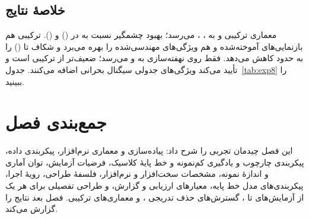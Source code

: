 \subsection{خلاصۀ نتایج}

معماری ترکیبی  و  به  ،  ،   می‌رسد؛ بهبود چشمگیر نسبت به  در  () و \texttt{} (). ترکیبی هم بازنمایی‌های آموخته‌شده و هم ویژگی‌های مهندسی‌شده را بهره می‌برد و شکاف تا  () را به حدود   کاهش می‌دهد.  فقط روی نهفته‌سازی  به   و   می‌رسد؛ ضعیف‌تر از ترکیبی است و تأیید می‌کند ویژگی‌های جدولی سیگنال بحرانی اضافه می‌کنند. جدول~\ref{tab:exp8} را ببینید.

\section{جمع‌بندی فصل}

این فصل چیدمان تجربی را شرح داد: پیاده‌سازی و معماری نرم‌افزار، پیکربندی داده، پیکربندی چارچوب  و یادگیری کم‌نمونه و خط پایۀ کلاسیک، فرضیات آزمایش، توان آماری و اندازۀ نمونه، مشخصات سخت‌افزار و نرم‌افزار، فلسفۀ طراحی، رویۀ اجرا، پیکربندی‌های مدل خط پایه، معیارهای ارزیابی و گزارش، و طراحی تفصیلی برای هر یک از آزمایش‌های  تا ، گسترش‌های حذف تدریجی ، و معماری‌های ترکیبی. فصل بعد نتایج را گزارش می‌کند.
